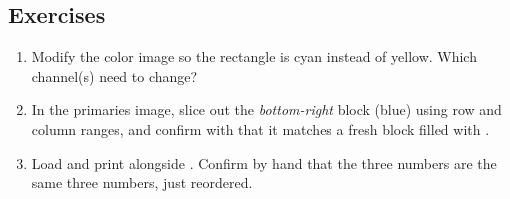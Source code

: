 \subsection*{Exercises}
\begin{enumerate}
  \item Modify the color image  so the rectangle is cyan instead of yellow. Which channel(s) need to change?
  \item In the primaries image, slice out the \emph{bottom-right} block (blue) using row and column ranges, and confirm with  that it matches a fresh block filled with .
  \item Load  and print  alongside . Confirm by hand that the three numbers are the same three numbers, just reordered.
\end{enumerate}

\vfill
{}
